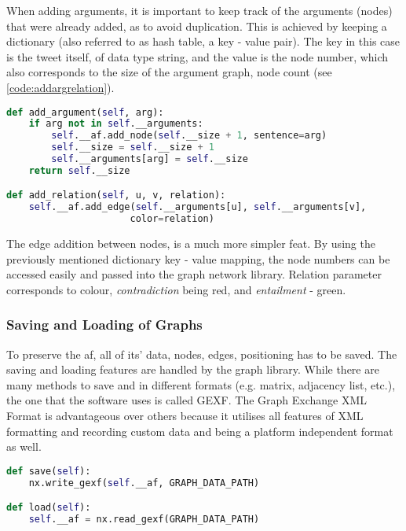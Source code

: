        When adding arguments, it is important to keep track of the arguments (nodes) that were already added, as to avoid duplication. This is achieved by keeping a dictionary (also referred to as hash table, a key - value pair). The key in this case is the tweet itself, of data type string, and the value is the node number, which also corresponds to the size of the argument graph, node count (see \cref{code:addargrelation}).
        
        \begin{lstlisting}[language=Python, caption=Adding Arguments and Relations, label=code:addargrelation]
def add_argument(self, arg):
    if arg not in self.__arguments:
        self.__af.add_node(self.__size + 1, sentence=arg)
        self.__size = self.__size + 1
        self.__arguments[arg] = self.__size
    return self.__size

def add_relation(self, u, v, relation):
    self.__af.add_edge(self.__arguments[u], self.__arguments[v], 
                      color=relation)
        \end{lstlisting}
        
        The edge addition between nodes, is a much more simpler feat. By using the previously mentioned dictionary key - value mapping, the node numbers can be accessed easily and passed into the graph network library. Relation parameter corresponds to colour, \textit{contradiction} being red, and \textit{entailment} - green.
        
        \subsubsection{Saving and Loading of Graphs}
            To preserve the \gls{af}, all of its' data, nodes, edges, positioning has to be saved. The saving and loading features are handled by the graph library. While there are many methods to save and in different formats (e.g. matrix, adjacency list, etc.), the one that the software uses is called GEXF. The Graph Exchange XML Format is advantageous over others because it utilises all features of XML formatting and recording custom data and being a platform independent format as well.
        
            \begin{lstlisting}[language=Python, caption=Saving and Loading Argument Frameworks, label=code:afsaveload]
def save(self):
    nx.write_gexf(self.__af, GRAPH_DATA_PATH)

def load(self):
    self.__af = nx.read_gexf(GRAPH_DATA_PATH)
            \end{lstlisting}
    
